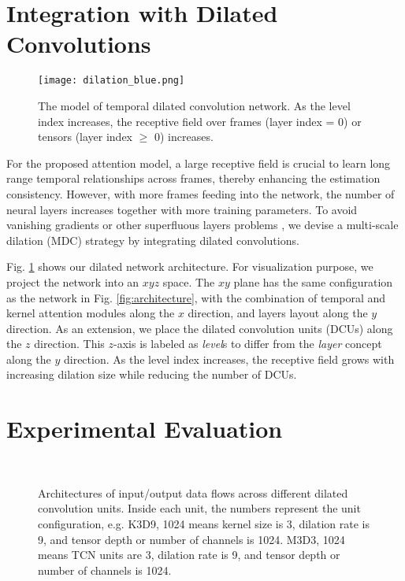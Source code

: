 \documentclass[twocolumn]{svjour3}          \smartqed  \usepackage{graphicx}
\begin{document}
\section{Integration with Dilated Convolutions}\label{dilation}

\begin{figure}[]
  \texttt{[image: dilation\_blue.png]}
  \caption{The model of temporal dilated convolution network. As the level index increases, the receptive field over frames (layer index = 0) or tensors (layer index $\geq$  0) increases.  }
\label{fig:3Ddilation}
\end{figure}

For the proposed attention model, a large receptive field is crucial to learn long range temporal relationships across frames, thereby enhancing the estimation consistency. However, with more frames feeding into the network, the number of neural layers increases together with more training parameters. To avoid vanishing gradients or other superfluous layers problems \citep{Martinez2017}, we devise a multi-scale dilation (MDC) strategy by integrating dilated convolutions. 

Fig. \ref{fig:3Ddilation} shows our dilated network architecture. For visualization purpose, we project the network into an $xyz$ space.  The $xy$ plane has the same configuration as the network in
 Fig. \ref{fig:architecture}, with the combination of temporal and kernel attention modules along the $x$ direction, and layers layout along the $y$ direction. As an extension, we place the dilated convolution units (DCUs) along the $z$ direction. This $z$-axis is labeled as \emph{level}s to differ from the \emph{layer} concept along the $y$ direction. As the level index increases, the receptive field grows with increasing dilation size while reducing the  number of DCUs.

\section{Experimental Evaluation}

\begin{figure}
\\
\caption{Architectures of input/output data flows across different dilated convolution units. Inside each unit, the numbers represent the unit configuration, e.g. K3D9, 1024 means kernel size is 3, dilation rate is 9, and tensor depth or number of channels is 1024. M3D3, 1024 means TCN units are 3, dilation rate is 9, and tensor depth or number of channels is 1024.}
\label{fig:config}
\end{figure}
\end{document}
